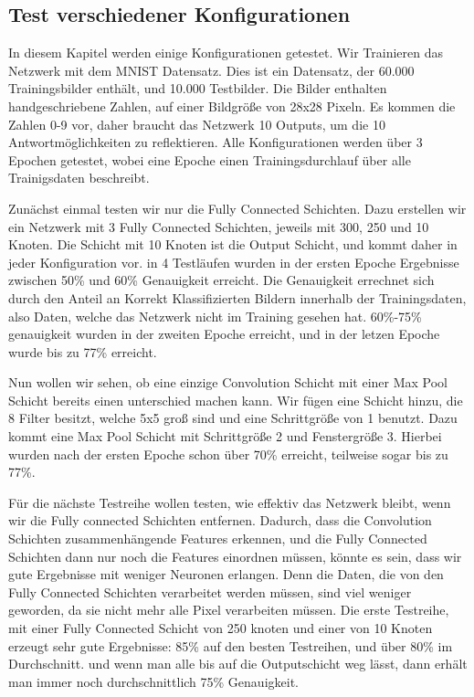 \documentclass[12pt]{article}
\begin{document}
\subsection{Test verschiedener Konfigurationen}
In diesem Kapitel werden einige Konfigurationen getestet. Wir Trainieren das Netzwerk mit dem MNIST Datensatz. Dies ist ein Datensatz, der 60.000 Trainingsbilder enthält, und 10.000 Testbilder. Die Bilder enthalten handgeschriebene Zahlen, auf einer Bildgröße von 28x28 Pixeln. Es kommen die Zahlen 0-9 vor, daher braucht das Netzwerk 10 Outputs, um die 10 Antwortmöglichkeiten zu reflektieren. Alle Konfigurationen werden über 3 Epochen getestet, wobei eine Epoche einen Trainingsdurchlauf über alle Trainigsdaten beschreibt.

Zunächst einmal testen wir nur die Fully Connected Schichten. Dazu erstellen wir ein Netzwerk mit 3 Fully Connected Schichten, jeweils mit 300, 250 und 10 Knoten.
Die Schicht mit 10 Knoten ist die Output Schicht, und kommt daher in jeder Konfiguration vor. 
in 4 Testläufen wurden in der ersten Epoche Ergebnisse zwischen 50\% und 60\% Genauigkeit erreicht. Die Genauigkeit errechnet sich durch den Anteil an Korrekt Klassifizierten Bildern innerhalb der Trainingsdaten, also Daten, welche das Netzwerk nicht im Training gesehen hat. 60\%-75\% genauigkeit wurden in der zweiten Epoche erreicht, und in der letzen Epoche wurde bis zu 77\% erreicht.

Nun wollen wir sehen, ob eine einzige Convolution Schicht mit einer Max Pool Schicht bereits einen unterschied machen kann. Wir fügen eine Schicht hinzu, die 8 Filter besitzt, welche 5x5 groß sind und eine Schrittgröße von 1 benutzt. Dazu kommt eine Max Pool Schicht mit Schrittgröße 2 und Fenstergröße 3.
Hierbei wurden nach der ersten Epoche schon über 70\% erreicht, teilweise sogar bis zu 77\%. 

Für die nächste Testreihe wollen testen, wie effektiv das Netzwerk bleibt, wenn wir die Fully connected Schichten entfernen. Dadurch, dass die Convolution Schichten zusammenhängende Features erkennen, und die Fully Connected Schichten dann nur noch die Features einordnen müssen, könnte es sein, dass wir gute Ergebnisse mit weniger Neuronen erlangen. Denn die Daten, die von den Fully Connected Schichten verarbeitet werden müssen, sind viel weniger geworden, da sie nicht mehr alle Pixel verarbeiten müssen.
Die erste Testreihe, mit einer Fully Connected Schicht von 250 knoten und einer von 10 Knoten erzeugt sehr gute Ergebnisse: 85\% auf den besten Testreihen, und über 80\% im Durchschnitt.
und wenn man alle bis auf die Outputschicht weg lässt, dann erhält man immer noch durchschnittlich 75\% Genauigkeit.
\end{document}
